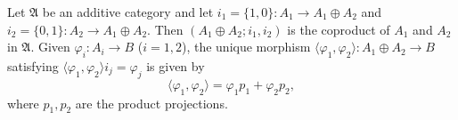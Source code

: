 Let $\mathfrak{A}$ be an additive category and let $i_1 = \{1, 0\}: A_1 \to A_1 \oplus A_2$ and $i_2 = \{0, 1\}: A_2 \to A_1 \oplus A_2$. Then $(A_1 \oplus A_2; i_1, i_2)$ is the coproduct of $A_1$ and $A_2$ in $\mathfrak{A}$. Given $\varphi_i: A_i \to B$ ($i = 1, 2$), the unique morphism $\langle \varphi_1, \varphi_2 \rangle: A_1 \oplus A_2 \to B$ satisfying $\langle \varphi_1, \varphi_2 \rangle i_j = \varphi_j$ is given by
$$\langle \varphi_1, \varphi_2 \rangle = \varphi_1 p_1 + \varphi_2 p_2,$$
where $p_1, p_2$ are the product projections.
